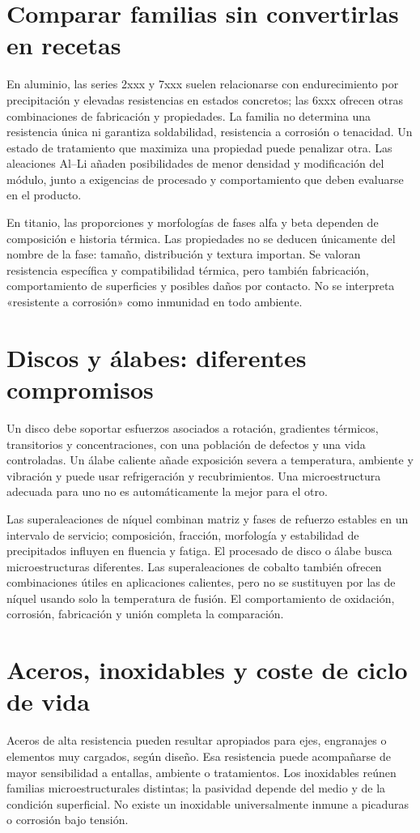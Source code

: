 
\section{Comparar familias sin convertirlas en recetas}
En aluminio, las series 2xxx y 7xxx suelen relacionarse con endurecimiento por precipitación y elevadas resistencias en estados concretos; las 6xxx ofrecen otras combinaciones de fabricación y propiedades. La familia no determina una resistencia única ni garantiza soldabilidad, resistencia a corrosión o tenacidad. Un estado de tratamiento que maximiza una propiedad puede penalizar otra. Las aleaciones Al--Li añaden posibilidades de menor densidad y modificación del módulo, junto a exigencias de procesado y comportamiento que deben evaluarse en el producto.

En titanio, las proporciones y morfologías de fases alfa y beta dependen de composición e historia térmica. Las propiedades no se deducen únicamente del nombre de la fase: tamaño, distribución y textura importan. Se valoran resistencia específica y compatibilidad térmica, pero también fabricación, comportamiento de superficies y posibles daños por contacto. No se interpreta «resistente a corrosión» como inmunidad en todo ambiente.
\section{Discos y álabes: diferentes compromisos}
Un disco debe soportar esfuerzos asociados a rotación, gradientes térmicos, transitorios y concentraciones, con una población de defectos y una vida controladas. Un álabe caliente añade exposición severa a temperatura, ambiente y vibración y puede usar refrigeración y recubrimientos. Una microestructura adecuada para uno no es automáticamente la mejor para el otro.

Las superaleaciones de níquel combinan matriz y fases de refuerzo estables en un intervalo de servicio; composición, fracción, morfología y estabilidad de precipitados influyen en fluencia y fatiga. El procesado de disco o álabe busca microestructuras diferentes. Las superaleaciones de cobalto también ofrecen combinaciones útiles en aplicaciones calientes, pero no se sustituyen por las de níquel usando solo la temperatura de fusión. El comportamiento de oxidación, corrosión, fabricación y unión completa la comparación.
\section{Aceros, inoxidables y coste de ciclo de vida}
Aceros de alta resistencia pueden resultar apropiados para ejes, engranajes o elementos muy cargados, según diseño. Esa resistencia puede acompañarse de mayor sensibilidad a entallas, ambiente o tratamientos. Los inoxidables reúnen familias microestructurales distintas; la pasividad depende del medio y de la condición superficial. No existe un inoxidable universalmente inmune a picaduras o corrosión bajo tensión.

